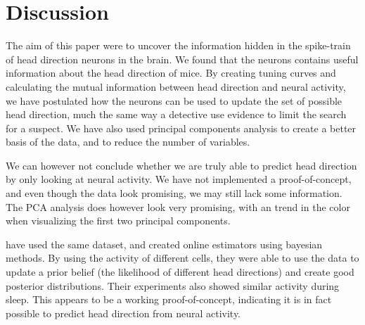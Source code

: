 \section{Discussion}
The aim of this paper were to uncover the information hidden in the spike-train of head direction neurons in the brain.
We found that the neurons contains useful information about the head direction of mice. By creating tuning curves and calculating the mutual information between head direction and neural activity, we have postulated how the neurons can be used to update the set of possible head direction, much the same way a detective use evidence to limit the search for a suspect. We have also used principal components analysis to create a better basis of the data, and to reduce the number of variables.

We can however not conclude whether we are truly able to predict head direction by only looking at neural activity. We have not implemented a proof-of-concept, and even though the data look promising, we may still lack some information. The PCA analysis does however look very promising, with an trend in the color when visualizing the first two principal components.


\cite{projectdata} have used the same dataset, and created online estimators using bayesian methods. By using the activity of different cells, they were able to use the data to update a prior belief (the likelihood of different head directions) and create good posterior distributions. Their experiments also showed similar activity during sleep. This appears to be a working proof-of-concept, indicating it is in fact possible to predict head direction from neural activity.

